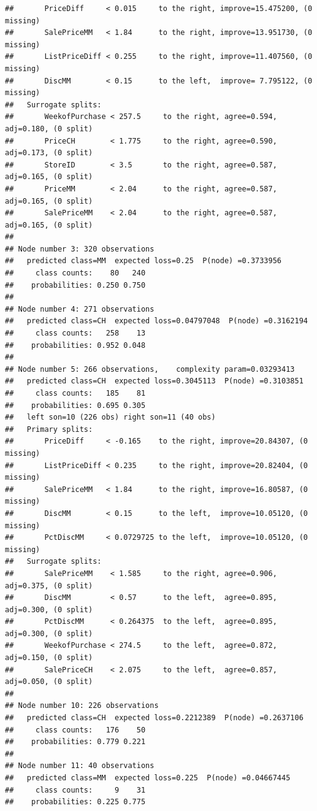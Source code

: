 \documentclass[]{book}
\begin{document}
\begin{verbatim}
##       PriceDiff     < 0.015     to the right, improve=15.475200, (0 missing)
##       SalePriceMM   < 1.84      to the right, improve=13.951730, (0 missing)
##       ListPriceDiff < 0.255     to the right, improve=11.407560, (0 missing)
##       DiscMM        < 0.15      to the left,  improve= 7.795122, (0 missing)
##   Surrogate splits:
##       WeekofPurchase < 257.5     to the right, agree=0.594, adj=0.180, (0 split)
##       PriceCH        < 1.775     to the right, agree=0.590, adj=0.173, (0 split)
##       StoreID        < 3.5       to the right, agree=0.587, adj=0.165, (0 split)
##       PriceMM        < 2.04      to the right, agree=0.587, adj=0.165, (0 split)
##       SalePriceMM    < 2.04      to the right, agree=0.587, adj=0.165, (0 split)
## 
## Node number 3: 320 observations
##   predicted class=MM  expected loss=0.25  P(node) =0.3733956
##     class counts:    80   240
##    probabilities: 0.250 0.750 
## 
## Node number 4: 271 observations
##   predicted class=CH  expected loss=0.04797048  P(node) =0.3162194
##     class counts:   258    13
##    probabilities: 0.952 0.048 
## 
## Node number 5: 266 observations,    complexity param=0.03293413
##   predicted class=CH  expected loss=0.3045113  P(node) =0.3103851
##     class counts:   185    81
##    probabilities: 0.695 0.305 
##   left son=10 (226 obs) right son=11 (40 obs)
##   Primary splits:
##       PriceDiff     < -0.165    to the right, improve=20.84307, (0 missing)
##       ListPriceDiff < 0.235     to the right, improve=20.82404, (0 missing)
##       SalePriceMM   < 1.84      to the right, improve=16.80587, (0 missing)
##       DiscMM        < 0.15      to the left,  improve=10.05120, (0 missing)
##       PctDiscMM     < 0.0729725 to the left,  improve=10.05120, (0 missing)
##   Surrogate splits:
##       SalePriceMM    < 1.585     to the right, agree=0.906, adj=0.375, (0 split)
##       DiscMM         < 0.57      to the left,  agree=0.895, adj=0.300, (0 split)
##       PctDiscMM      < 0.264375  to the left,  agree=0.895, adj=0.300, (0 split)
##       WeekofPurchase < 274.5     to the left,  agree=0.872, adj=0.150, (0 split)
##       SalePriceCH    < 2.075     to the left,  agree=0.857, adj=0.050, (0 split)
## 
## Node number 10: 226 observations
##   predicted class=CH  expected loss=0.2212389  P(node) =0.2637106
##     class counts:   176    50
##    probabilities: 0.779 0.221 
## 
## Node number 11: 40 observations
##   predicted class=MM  expected loss=0.225  P(node) =0.04667445
##     class counts:     9    31
##    probabilities: 0.225 0.775
\end{verbatim}
\end{document}

